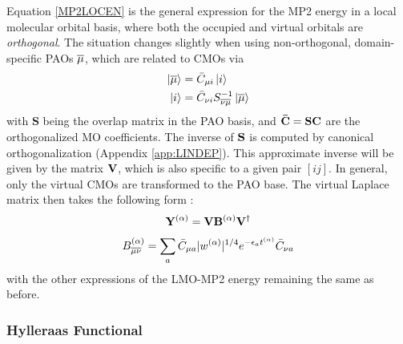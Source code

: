 \noindent Equation \ref{MP2LOCEN} is the general expression for the MP2 energy in a local molecular orbital basis, where both the occupied and virtual orbitals are \emph{orthogonal}. The situation changes slightly when using non-orthogonal, domain-specific PAOs $\overline{\mu}$, which are related to CMOs via
\begin{align}
\ket{\overline{\mu}} &= \bar{C}_{\mu i} \ket{i} \\
\ket{i} &= \bar{C}_{\nu i} S_{\overline{\nu}\overline{\mu}}^{-1} \ket{\overline{\mu}} 
\end{align}
\noindent with $\mathbf{S}$ being the overlap matrix in the PAO basis, and $\mathbf{\bar{C}} = \mathbf{SC}$ are the orthogonalized MO coefficients. The inverse of $\mathbf{S}$ is computed by canonical orthogonalization (Appendix \ref{app:LINDEP}). This approximate inverse will be given by the matrix $\mathbf{V}$, which is also specific to a given pair $[ij]$. In general, only the virtual CMOs are transformed to the PAO base. The virtual Laplace matrix then takes the following form \cite{Kat2008}:
\begin{equation}
\mathbf{Y}^{(\alpha)} = \mathbf{V} \mathbf{B}^{(\alpha)} \mathbf{V} ^{\dagger} 
\end{equation}
\begin{equation}
B_{\overline{\mu}\overline{\nu}}^{(\alpha)} = \sum_a \bar{C}_{\mu a} |w^{(\alpha)}|^{1/4} e^{-\epsilon_a t^{(\alpha)}} \bar{C}_{\nu a}
\end{equation}
\noindent with the other expressions of the LMO-MP2 energy remaining the same as before.


\subsubsection{Hylleraas Functional}

